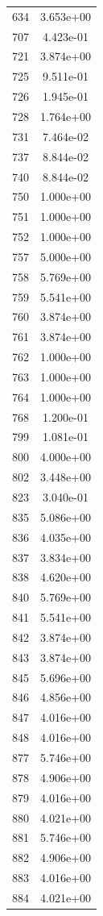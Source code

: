 \documentclass[12pt]{article}
\begin{document}
\begin{longtable}{@{}cc@{}}
634 & 3.653e+00 \\
707 & 4.423e-01 \\
721 & 3.874e+00 \\
725 & 9.511e-01 \\
726 & 1.945e-01 \\
728 & 1.764e+00 \\
731 & 7.464e-02 \\
737 & 8.844e-02 \\
740 & 8.844e-02 \\
750 & 1.000e+00 \\
751 & 1.000e+00 \\
752 & 1.000e+00 \\
757 & 5.000e+00 \\
758 & 5.769e+00 \\
759 & 5.541e+00 \\
760 & 3.874e+00 \\
761 & 3.874e+00 \\
762 & 1.000e+00 \\
763 & 1.000e+00 \\
764 & 1.000e+00 \\
768 & 1.200e-01 \\
799 & 1.081e-01 \\
800 & 4.000e+00 \\
802 & 3.448e+00 \\
823 & 3.040e-01 \\
835 & 5.086e+00 \\
836 & 4.035e+00 \\
837 & 3.834e+00 \\
838 & 4.620e+00 \\
840 & 5.769e+00 \\
841 & 5.541e+00 \\
842 & 3.874e+00 \\
843 & 3.874e+00 \\
845 & 5.696e+00 \\
846 & 4.856e+00 \\
847 & 4.016e+00 \\
848 & 4.016e+00 \\
877 & 5.746e+00 \\
878 & 4.906e+00 \\
879 & 4.016e+00 \\
880 & 4.021e+00 \\
881 & 5.746e+00 \\
882 & 4.906e+00 \\
883 & 4.016e+00 \\
884 & 4.021e+00 \\

\end{longtable}
\end{document}
